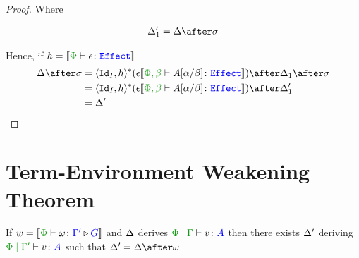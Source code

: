 \documentclass{report}
\begin{document}
\begin{framed}
\begin{proof}
        Where 
        
        \begin{align*}
            \D_1' = \D\after\si
        \end{align*}
        
        
        
        Hence, if $h = \deno{\typerelation{\P}{\e}{\effect}}$
        \begin{align*}
            \D\after\si &= \pr{\Id{I}}{h}\star(\e{\deno{\typerelation{\P,\b}{A\ssub{\b}{\a}}{\effect}}})\after\D_1\after\si\\
            &= \pr{\Id{I}}{h}\star(\e{\deno{\typerelation{\P,\b}{A\ssub{\b}{\a}}{\effect}}})\after\D_1'\\
            & = \D'
        \end{align*}
    \end{proof}
    
\end{framed}

\chapter{Term-Environment Weakening Theorem}

\begin{theorem}
    If $w = \deno{\ewrel{\P}{\w}{\G'}{G}}$ and $\Delta$ derives  $\gpetyperelation{v}{A}$ then there exists $\Delta'$ deriving $\etyperelation{\P}{\G'}{v}{A}$ such that $\D' = \D\after\w$
\end{theorem}
\end{document}
